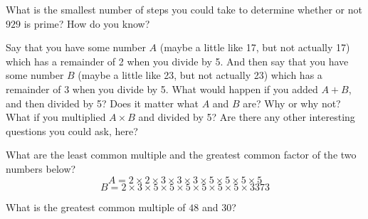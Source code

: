 \documentclass[nooutcomes,noauthor,handout]{ximera}
\begin{document}
\begin{problem}
What is the smallest number of steps you could take to determine whether or not $929$ is prime? How do you know?
\vskip 0.5in
\end{problem}



\begin{problem}
Say that you have some number $A$ (maybe a little like 17, but not actually 17) which has a remainder of 2 when you divide by 5. And then say that you have some number $B$ (maybe a little like 23, but not actually 23) which has a remainder of 3 when you divide by 5. What would happen if you added $A+B$, and then divided by 5? Does it matter what $A$ and $B$ are? Why or why not? What if you multiplied $A\times B$ and divided by 5? Are there any other interesting questions you could ask, here?
\vskip 0.5in
\end{problem}


\begin{problem}
What are the least common multiple and the greatest common factor of the two numbers below?
\[
A = 2 \times 2 \times 3 \times 3 \times 3 \times 5 \times 5 \times 5 \times 5
\]
\[
B = 2 \times 3 \times 5 \times 5 \times 5 \times 5 \times 5 \times 5 \times 3373
\]
\vskip 0.5in
\end{problem}



\begin{problem}
What is the greatest common multiple of $48$ and $30$?
\vskip 0.5in
\end{problem}
\end{document}
